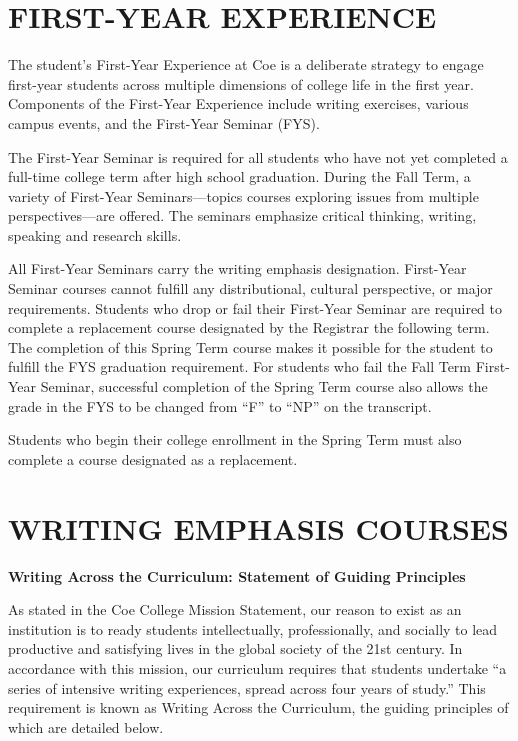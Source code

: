 \documentclass[
  letterpaper,
]{scrbook}
\begin{document}
\chapter{FIRST-YEAR EXPERIENCE}\label{sec-first-year-experience}

The student's First-Year Experience at Coe is a deliberate strategy to
engage first-year students across multiple dimensions of college life in
the first year. Components of the First-Year Experience include writing
exercises, various campus events, and the First-Year Seminar (FYS).

The First-Year Seminar is required for all students who have not yet
completed a full-time college term after high school graduation. During
the Fall Term, a variety of First-Year Seminars---topics courses
exploring issues from multiple perspectives---are offered. The seminars
emphasize critical thinking, writing, speaking and research skills.

All First-Year Seminars carry the writing emphasis designation.
First-Year Seminar courses cannot fulfill any distributional, cultural
perspective, or major requirements. Students who drop or fail their
First-Year Seminar are required to complete a replacement course
designated by the Registrar the following term. The completion of this
Spring Term course makes it possible for the student to fulfill the FYS
graduation requirement. For students who fail the Fall Term First-Year
Seminar, successful completion of the Spring Term course also allows the
grade in the FYS to be changed from ``F'' to ``NP'' on the transcript.

Students who begin their college enrollment in the Spring Term must also
complete a course designated as a replacement.

\chapter{WRITING EMPHASIS COURSES}\label{sec-writing-emphasis-courses}

\textbf{Writing Across the Curriculum: Statement of Guiding Principles}

As stated in the Coe College Mission Statement, our reason to exist as
an institution is to ready students intellectually, professionally, and
socially to lead productive and satisfying lives in the global society
of the 21st century. In accordance with this mission, our curriculum
requires that students undertake ``a series of intensive writing
experiences, spread across four years of study.'' This requirement is
known as Writing Across the Curriculum, the guiding principles of which
are detailed below.
\end{document}
